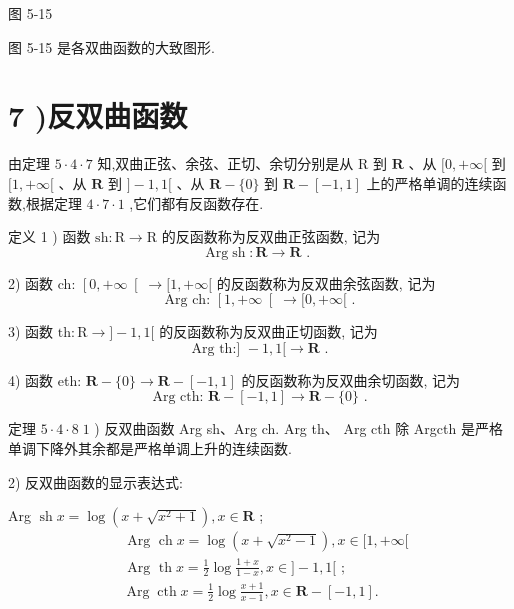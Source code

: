 图 5-15

图 5-15 是各双曲函数的大致图形.

\section*{7 )反双曲函数}

由定理 $5 \cdot  4 \cdot  7$ 知,双曲正弦、余弦、正切、余切分别是从 $\mathrm{R}$ 到 $\mathbf{R}$ 、从 $\lbrack 0, + \infty \lbrack$ 到 $\lbrack 1, + \infty \lbrack$ 、从 $\mathbf{R}$ 到 $\rbrack  - 1,1\lbrack$ 、从 $\mathbf{R} - \{ 0\}$ 到 $\mathbf{R} - \left\lbrack  {-1,1}\right\rbrack$ 上的严格单调的连续函数,根据定理 $4 \cdot  7 \cdot  1$ ,它们都有反函数存在.

定义 1 ) 函数 $\mathrm{{sh}} : \mathrm{R} \rightarrow  \mathrm{R}$ 的反函数称为反双曲正弦函数, 记为
$$\mathrm{{Arg}}\operatorname{sh} : \mathbf{R} \rightarrow  \mathbf{R}\text{ . }$$

2) 函数 ch: $\left\lbrack  {0, + \infty }\right\lbrack   \rightarrow  \lbrack 1, + \infty \lbrack$ 的反函数称为反双曲余弦函数, 记为
$$\text{ Arg ch: }\left\lbrack  {1, + \infty }\right\lbrack   \rightarrow  \lbrack 0, + \infty \lbrack \text{ . }$$

3) 函数 $\mathrm{{th}} : \mathrm{R} \rightarrow  \rbrack  - 1,1\lbrack$ 的反函数称为反双曲正切函数, 记为
$$\text{ Arg th:] } - 1,1\lbrack  \rightarrow  \mathbf{R}\text{ . }$$

4) 函数 eth: $\mathbf{R} - \{ 0\}  \rightarrow  \mathbf{R} - \left\lbrack  {-1,1}\right\rbrack$ 的反函数称为反双曲余切函数, 记为
$$\text{ Arg cth: }\mathbf{R} - \left\lbrack  {-1,1}\right\rbrack   \rightarrow  \mathbf{R} - \{ 0\} \text{ . }$$

定理 $5 \cdot  4 \cdot  8\;1$ ) 反双曲函数 Arg sh、Arg ch. Arg th、 Arg cth 除 Argcth 是严格单调下降外其余都是严格单调上升的连续函数.

2) 反双曲函数的显示表达式:

Arg $\operatorname{sh}x = \log \left( {x + \sqrt{{x}^{2} + 1}}\right) ,x \in  \mathbf{R}$ ;
\begin{align*}
	&\text{ Arg }\operatorname{ch}x = \log \left( {x + \sqrt{{x}^{2} - 1}}\right) ,x \in  \lbrack 1, + \infty \lbrack\\
	&\text{ Arg }\operatorname{th}x = \frac{1}{2}\log \frac{1 + x}{1 - x},x \in  \rbrack  - 1,1\lbrack \text{ ; }\\
	&\operatorname{Arg}\operatorname{cth}x = \frac{1}{2}\log \frac{x + 1}{x - 1},x \in  \mathbf{R} - \left\lbrack  {-1,1}\right\rbrack  .
\end{align*}


